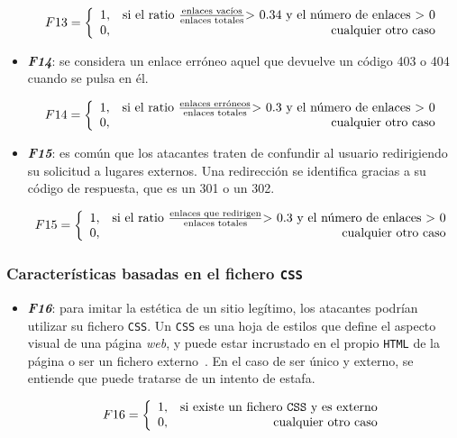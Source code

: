 \begin{itemize}
	\[F13 = \left\{ \begin{array}{lr} 1, & \text{si el ratio } \frac{\text{enlaces vacíos}}{\text{enlaces totales}} \text{> 0.34 y el número de enlaces > 0} \\
		0, & \text{\raggedright cualquier otro caso} \label{eqn:phishing_f13} \end{array}\right.\]
	
	\item \textit{\textbf{F14}}: se considera un enlace erróneo aquel que devuelve un código 403 o 404 cuando se pulsa en él.
	
	\[F14 = \left\{ \begin{array}{lr} 1, & \text{si el ratio } \frac{\text{enlaces erróneos}}{\text{enlaces totales}} \text{> 0.3 y el número de enlaces > 0} \\
		0, & \text{\raggedright cualquier otro caso} \label{eqn:phishing_f14} \end{array}\right.\]
	
	\item \textit{\textbf{F15}}: es común que los atacantes traten de confundir al usuario redirigiendo su solicitud a lugares externos. Una redirección se identifica gracias a su código de respuesta, que es un 301 o un 302.
	
	\[F15 = \left\{ \begin{array}{lr} 1, & \text{si el ratio } \frac{\text{enlaces que redirigen}}{\text{enlaces totales}} \text{> 0.3 y el número de enlaces > 0} \\
		0, & \text{\raggedright cualquier otro caso} \label{eqn:phishing_f15} \end{array}\right.\]
\end{itemize}


\subsubsection{Características basadas en el fichero \texttt{CSS}}

\begin{itemize}
	\item \textit{\textbf{F16}}: para imitar la estética de un sitio legítimo, los atacantes podrían utilizar su fichero \texttt{CSS}. Un \texttt{CSS} es una hoja de estilos que define el aspecto visual de una página \textit{web}, y puede estar incrustado en el propio \texttt{HTML} de la página o ser un fichero externo~\cite{cssExternos}. En el caso de ser único y externo, se entiende que puede tratarse de un intento de estafa.
	
	\[F16 = \left\{ \begin{array}{lr} 1, & \text{si existe un fichero \texttt{CSS} y es externo}\\
		0, & \text{\raggedright cualquier otro caso} \label{eqn:phishing_f16} \end{array}\right.\]
\end{itemize}


